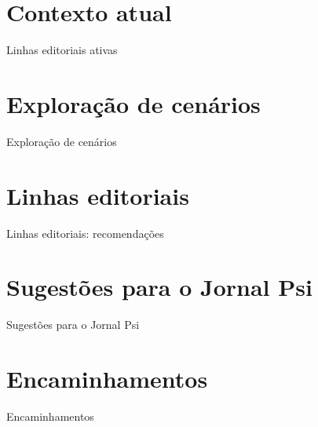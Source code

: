 \documentclass{beamer}
\begin{document}
		\section{Contexto atual}
	\begin{frame}{Linhas editoriais ativas}
	\end{frame}

	\section{Exploração de cenários}
	\begin{frame}{Exploração de cenários}
	\end{frame}

	\section{Linhas editoriais}
	\begin{frame}{Linhas editoriais: recomendações}
	\end{frame}

	\section{Sugestões para o Jornal Psi}
	\begin{frame}{Sugestões para o Jornal Psi}
	\end{frame}

	\section{Encaminhamentos}
	\begin{frame}{Encaminhamentos}
	\end{frame}
\end{document}
